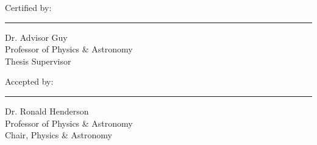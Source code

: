 \begin{flushleft}
    \fontsize{12pt}{14.4pt}\selectfont
    Certified by:
    \vspace{4pt}\hrule\vspace{4pt}
    \raggedleft
    \fontsize{10pt}{12pt}\selectfont
    Dr. Advisor Guy\\
    Professor of Physics \& Astronomy\\
    Thesis Supervisor\\
\end{flushleft}
\vspace{30pt}

\begin{flushleft}
    \fontsize{12pt}{14.4pt}\selectfont
    Accepted by:
    \vspace{4pt}\hrule\vspace{4pt}
    \raggedleft
    \fontsize{10pt}{12pt}\selectfont
    Dr. Ronald Henderson\\
    Professor of Physics \& Astronomy\\
    Chair, Physics \& Astronomy\\
    \vspace{36pt}
\end{flushleft}
\clearpage
\fontsize{12pt}{14.4pt}\selectfont

